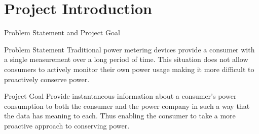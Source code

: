 \documentclass{beamer}
\begin{document}
\section{Project Introduction}
\begin{frame}{Problem Statement and Project Goal}
\begin{block}{Problem Statement}
Traditional power metering devices provide a consumer with a single measurement over a long period of time. This situation does not allow consumers to actively monitor their own power usage making it more difficult to proactively conserve power.
\end{block}\pause
\begin{block}{Project Goal}
Provide instantaneous information about a consumer's power consumption to both the consumer and the power company in such a way that the data has meaning to each. Thus enabling the consumer to take a more proactive approach to conserving power.
\end{block}
\end{frame}
\end{document}
